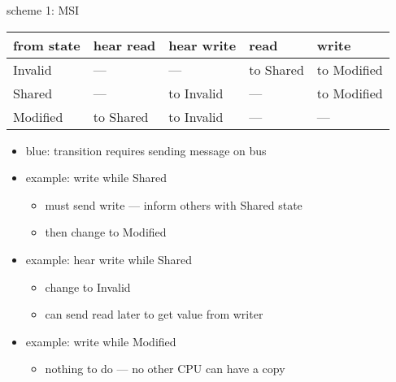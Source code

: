 \begin{frame}{scheme 1: MSI}
\begin{tabular}{lllll}
from state & hear read & hear write & read & write \\ \hline
Invalid & --- & --- & \color{blue}to Shared & \color{blue}to Modified \\
Shared & --- & to Invalid & --- & \color{blue}to Modified \\
Modified & \color{blue}to Shared & \color{blue}to Invalid & --- & --- \\
\end{tabular}
\begin{itemize}
\item {\color{blue}blue}: transition requires sending message on bus
\item<2-> example: write while Shared 
    \begin{itemize}
    \item must send write --- inform others with Shared state
    \item then change to Modified
    \end{itemize}
\item<3-> example: hear write while Shared
    \begin{itemize}
    \item change to Invalid
    \item can send read later to get value from writer
    \end{itemize}
\item<3-> example: write while Modified
    \begin{itemize}
    \item nothing to do --- no other CPU can have a copy
    \end{itemize}
\end{itemize}
\end{frame}

